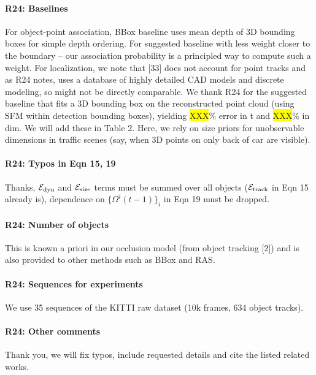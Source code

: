 \documentclass[10pt,twocolumn,letterpaper]{article}
\newcommand{\hili}[1]{\colorbox{yellow}{#1}}
\begin{document}
\paragraph{R24: Baselines}
For object-point association, BBox baseline uses mean depth of 3D bounding boxes for simple depth ordering. For suggested baseline with less weight closer to the boundary -- our association probability is a principled way to compute such a weight. For localization, we note that [33] does not account for point tracks and as R24 notes, uses a database of highly detailed CAD models and discrete modeling, so might not be directly comparable. We thank R24 for the suggested baseline that fits a 3D bounding box on the reconstructed point cloud (using SFM within detection bounding boxes), yielding \hili{XXX}\% error in t and \hili{XXX}\% in dim. We will add these in Table 2.
Here, we rely on size priors for unobservable dimensions in traffic scenes (say, when 3D points on only back of car are visible).


\vspace{-0.5cm}
\paragraph{R24: Typos in Eqn 15, 19}
Thanks, ${\mathcal{E}}_{\textrm{dyn}}$ and ${\mathcal{E}}_{\textrm{size}}$ terms must be summed over all objects (${\mathcal{E}}_{\textrm{track}}$ in Eqn 15 already is), dependence on $\{ \Omega^i (t-1) \}_i$ in Eqn 19 must be dropped.


\vspace{-0.5cm}
\paragraph{R24: Number of objects} 
This is known a priori in our occlusion model (from object tracking [2]) and is also provided to other methods such as BBox and RAS.

\vspace{-0.5cm}
\paragraph{R24: Sequences for experiments} 
We use 35 sequences of the KITTI raw dataset (10k frames, 634 object tracks).

\vspace{-0.5cm}
\paragraph{R24: Other comments}
Thank you, we will fix typos, include requested details and cite the listed related works.
\end{document}
